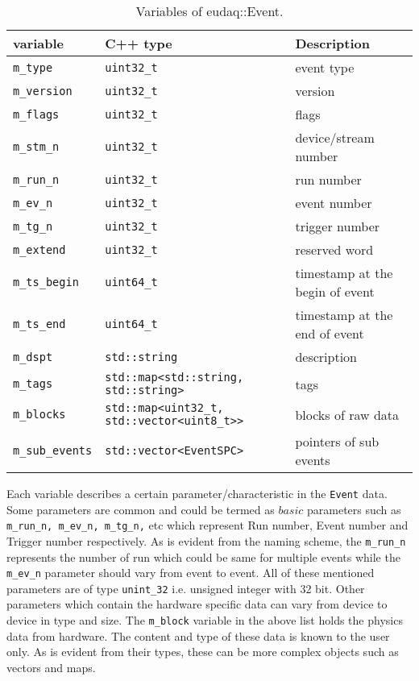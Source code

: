 \begin{table}[h]
\centering
\small
\begin{tabular}{ l | l | l }
  \textbf{variable} & \textbf{C++ type} & \textbf{Description}\\
  \hline
  \texttt{m\_type} & \texttt{uint32\_t} & event type\\
  \texttt{m\_version} & \texttt{uint32\_t} & version\\
  \texttt{m\_flags} & \texttt{uint32\_t} & flags\\
  \texttt{m\_stm\_n} & \texttt{uint32\_t} & device/stream number\\
  \texttt{m\_run\_n} & \texttt{uint32\_t} & run number\\
  \texttt{m\_ev\_n} & \texttt{uint32\_t} & event number\\
  \texttt{m\_tg\_n} & \texttt{uint32\_t} & trigger number\\
  \texttt{m\_extend} & \texttt{uint32\_t} & reserved word\\
  \texttt{m\_ts\_begin} & \texttt{uint64\_t} & timestamp at the begin of event\\
  \texttt{m\_ts\_end} & \texttt{uint64\_t} & timestamp at the end of event\\
  \texttt{m\_dspt} & \texttt{std::string} & description\\
  \texttt{m\_tags} & \texttt{std::map<std::string, std::string>} & tags\\
  \texttt{m\_blocks} & \texttt{std::map<uint32\_t, std::vector<uint8\_t>>} & blocks of raw data\\
  \texttt{m\_sub\_events} & \texttt{std::vector<EventSPC>} & pointers of sub events\\
\end{tabular}
\caption{Variables of eudaq::Event.}
\label{tab:eventdata2}
\end{table}


Each variable describes a certain parameter/characteristic in the \lstinline[style=cpp]{Event} data. Some parameters are common and could be termed as $basic$ parameters such as \lstinline[style=cpp]{m_run_n, m_ev_n, m_tg_n,} etc which represent Run number, Event number and Trigger number respectively. As is evident from the naming scheme, the \lstinline[style=cpp]{m_run_n} represents the number of run which could be same for multiple events while the \lstinline[style=cpp]{m_ev_n} parameter should vary from event to event. All of these mentioned parameters are of type \lstinline[style=cpp]{unint_32} i.e. unsigned integer with 32 bit. Other parameters which contain the hardware specific data can vary from device to device in type and size. The \lstinline[style=cpp]{m_block} variable in the above list holds the physics data from hardware. The content and type of these data is known to the user only. As is evident from their types, these can be more complex objects such as vectors and maps. %

